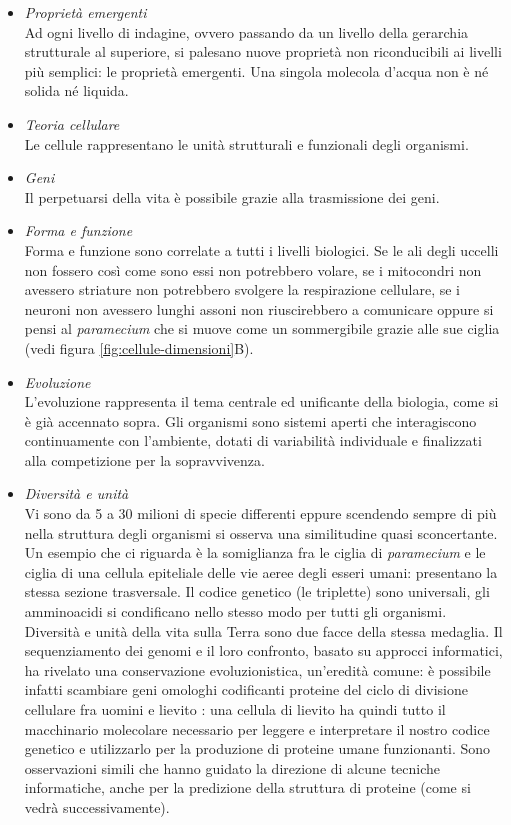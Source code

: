 \begin{itemize}
	\item \textit{Proprietà emergenti }\\
			Ad ogni livello di indagine, ovvero passando da un livello della gerarchia strutturale al superiore, si palesano nuove proprietà non riconducibili ai livelli più semplici: le proprietà emergenti. Una singola molecola d'acqua non è né solida né liquida.
	\item \textit{Teoria cellulare} \\
			Le cellule rappresentano le unità strutturali e funzionali degli organismi.
	\item \textit{Geni} \\
			Il perpetuarsi della vita è possibile grazie alla trasmissione dei geni.
	\item \textit{Forma e funzione} \\
			Forma e funzione sono correlate a tutti i livelli biologici. Se le ali degli uccelli non fossero così come sono essi non potrebbero volare, se i mitocondri non avessero striature non potrebbero svolgere la respirazione cellulare, se i neuroni non avessero lunghi assoni non riuscirebbero a comunicare oppure si pensi al \textit{paramecium} che si muove come un sommergibile grazie alle sue ciglia (vedi figura \ref{fig:cellule-dimensioni}B).
	\item \textit{Evoluzione} \\
			L'evoluzione rappresenta il tema centrale ed unificante della biologia, come si è già accennato sopra. Gli organismi sono sistemi aperti che interagiscono continuamente con l'ambiente, dotati di variabilità individuale e finalizzati alla competizione per la sopravvivenza. 
	\item \textit{Diversità e unità} \\
			Vi sono da 5 a 30 milioni di specie differenti eppure scendendo sempre di più nella struttura degli organismi si osserva una similitudine quasi sconcertante. Un esempio che ci riguarda è la somiglianza fra le ciglia di \textit{paramecium} e le ciglia di una cellula epiteliale delle vie aeree degli esseri umani: presentano la stessa sezione trasversale. Il codice genetico (le triplette) sono universali, gli amminoacidi si condificano nello stesso modo per tutti gli organismi. Diversità e unità della vita sulla Terra sono due facce della stessa medaglia. Il sequenziamento dei genomi e il loro confronto, basato su approcci informatici, ha rivelato una conservazione evoluzionistica, un'eredità comune: è possibile infatti scambiare geni omologhi codificanti proteine del ciclo di divisione cellulare fra uomini e lievito \supercite{alberts2018essential}: una cellula di lievito ha quindi tutto il macchinario molecolare necessario per leggere e interpretare il nostro codice genetico e utilizzarlo per la produzione di proteine umane funzionanti. Sono osservazioni simili che hanno guidato la direzione di alcune tecniche informatiche, anche per la predizione della struttura di proteine (come si vedrà successivamente).
			
\end{itemize}


